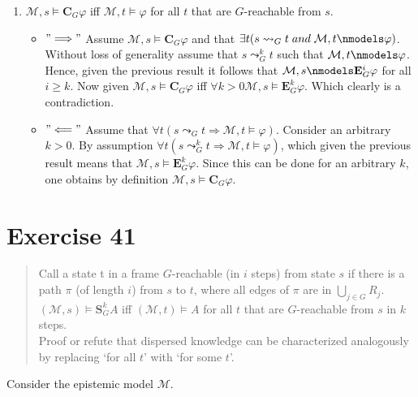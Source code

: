 \documentclass[11pt,a4paper]{article}
\newcommand{\edisp}{\mathbf{S}}
\newcommand{\egen}{\mathbf{E}}
\newcommand{\ecom}{\mathbf{C}}
\newcommand{\sand}{\; and \;}
\newcommand{\sto}{\Rightarrow}
\begin{document}
\begin{enumerate}
\begin{itemize}
\end{itemize}


\item $\mathcal{M},s \models \ecom_G \varphi$ iff $\mathcal{M},t \models \varphi$ for all $t$ that are $G$-reachable from $s$.
\begin{itemize}

\item $"\Longrightarrow"$ 
Assume $\mathcal{M},s \models \ecom_G \varphi$ and that $\exists t (s \leadsto_G t \sand \mathcal{M}, t \nmodels \varphi)$. Without loss of generality assume that $s \leadsto_G^k t$ such that $\mathcal{M},t \nmodels \varphi$. Hence, given the previous result it follows that $\mathcal{M},s \nmodels \egen_G^i \varphi$ for all $i\geq k$. Now given $\mathcal{M}, s \models \ecom_G \varphi$ iff $\forall k > 0 \mathcal{M},s \models \egen_G^k \varphi$. Which clearly is a contradiction.  
\item $"\Longleftarrow"$ 
Assume that $\forall t (s \leadsto_G t \sto \mathcal{M},t \models \varphi)$. Consider an arbitrary $k>0$. By assumption $\forall t (s \leadsto_G^k t \sto \mathcal{M},t \models \varphi)$, which given the previous result means that $\mathcal{M},s \models \egen_G^k \varphi$. Since this can be done for an arbitrary $k$, one obtains by definition $\mathcal{M},s \models \ecom_G \varphi$.

\end{itemize}
\end{enumerate}



\section*{Exercise 41}
\begin{quote}
Call a state t in a frame $G$-reachable (in $i$ steps) from state $s$ if there is a path $\pi$ (of length $i$) from $s$ to $t$, where all edges of $\pi$ are in $\bigcup_{j \in G} R_j$. \\

$(\mathcal{M},s) \models \edisp_G^k A$ iff $(\mathcal{M},t) \models A$ for all $t$ that are $G$-reachable from $s$ in $k$ steps.\\

Proof or refute that dispersed knowledge can be characterized analogously by replacing ‘for all $t$’ with ‘for some $t$’.
\end{quote}

Consider the epistemic model $\mathcal{M}$.
\end{document}
